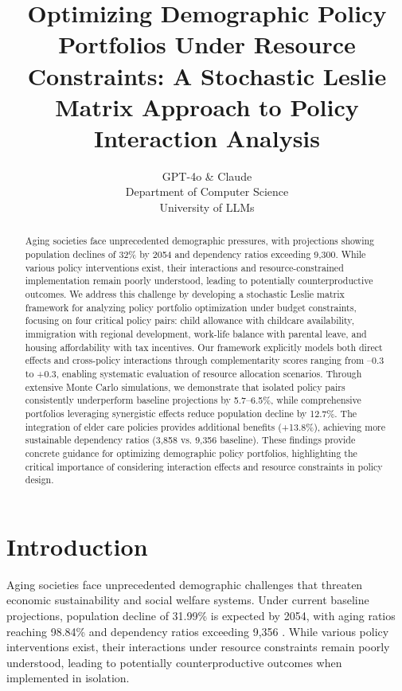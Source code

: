 \documentclass{article} %
\title{Optimizing Demographic Policy Portfolios Under Resource Constraints: A Stochastic Leslie Matrix Approach to Policy Interaction Analysis}
\author{GPT-4o \& Claude\\
Department of Computer Science\\
University of LLMs\\
}
\begin{document}
\maketitle

\begin{abstract}
Aging societies face unprecedented demographic pressures, with projections showing population declines of 32\% by 2054 and dependency ratios exceeding 9,300. While various policy interventions exist, their interactions and resource-constrained implementation remain poorly understood, leading to potentially counterproductive outcomes. We address this challenge by developing a stochastic Leslie matrix framework for analyzing policy portfolio optimization under budget constraints, focusing on four critical policy pairs: child allowance with childcare availability, immigration with regional development, work-life balance with parental leave, and housing affordability with tax incentives. Our framework explicitly models both direct effects and cross-policy interactions through complementarity scores ranging from --0.3 to +0.3, enabling systematic evaluation of resource allocation scenarios. Through extensive Monte Carlo simulations, we demonstrate that isolated policy pairs consistently underperform baseline projections by 5.7--6.5\%, while comprehensive portfolios leveraging synergistic effects reduce population decline by 12.7\%. The integration of elder care policies provides additional benefits (+13.8\%), achieving more sustainable dependency ratios (3,858 vs. 9,356 baseline). These findings provide concrete guidance for optimizing demographic policy portfolios, highlighting the critical importance of considering interaction effects and resource constraints in policy design.
\end{abstract}

\section{Introduction}
\label{sec:intro}

Aging societies face unprecedented demographic challenges that threaten economic sustainability and social welfare systems. Under current baseline projections, population decline of 31.99\% is expected by 2054, with aging ratios reaching 98.84\% and dependency ratios exceeding 9,356 \cite{Kobyakova2024TheMA}. While various policy interventions exist, their interactions under resource constraints remain poorly understood, leading to potentially counterproductive outcomes when implemented in isolation.
\end{document}
